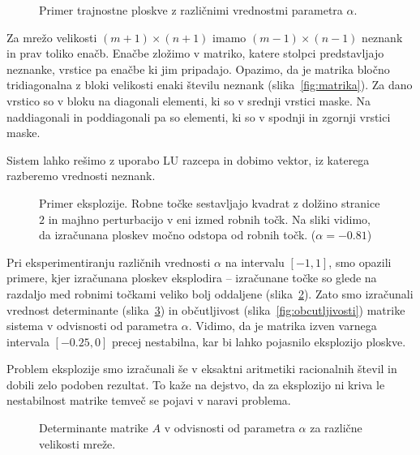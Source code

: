 \documentclass[twocolumn, 10pt]{article}    %
\begin{document}
\begin{figure}
    \centering
    \resizebox*{!}{7cm}{}
    \caption{Primer trajnostne ploskve z različnimi vrednostmi parametra $\alpha$.}
    \label{fig:alfe}
\end{figure}

Za mrežo velikosti $(m+1) \times (n+1)$ imamo $(m-1) \times (n-1)$ neznank in prav toliko enačb. Enačbe zložimo v matriko, katere stolpci predstavljajo neznanke, vrstice pa enačbe ki jim pripadajo. Opazimo, da je matrika bločno tridiagonalna z bloki velikosti enaki številu neznank (slika~\ref{fig:matrika}). Za dano vrstico so v bloku na diagonali elementi, ki so v srednji vrstici maske. Na naddiagonali in poddiagonali pa so elementi, ki so v spodnji in zgornji vrstici maske.

Sistem lahko rešimo z uporabo LU razcepa in dobimo vektor, iz katerega razberemo vrednosti neznank.

\begin{figure}
    \centering
    \resizebox*{!}{7cm}{}
    \caption{Primer eksplozije. Robne točke sestavljajo kvadrat z dolžino stranice $2$ in majhno perturbacijo v eni izmed robnih točk. Na sliki vidimo, da izračunana ploskev močno odstopa od robnih točk. ($\alpha = -0.81$)}
    \label{fig:eksplozija}
\end{figure}

Pri eksperimentiranju različnih vrednosti $\alpha$ na intervalu $[-1, 1]$, smo opazili primere, kjer izračunana ploskev eksplodira -- izračunane točke so glede na razdaljo med robnimi točkami veliko bolj oddaljene (slika~\ref{fig:eksplozija}). Zato smo izračunali vrednost determinante (slika~\ref{fig:determinante}) in občutljivost (slika~\ref{fig:obcutljivosti}) matrike sistema v odvisnosti od parametra $\alpha$. Vidimo, da je matrika izven varnega intervala $[-0.25, 0]$ precej nestabilna, kar bi lahko pojasnilo eksplozijo ploskve. 

Problem eksplozije smo izračunali še v eksaktni aritmetiki racionalnih števil in dobili zelo podoben rezultat. To kaže na dejstvo, da za eksplozijo ni kriva le nestabilnost matrike temveč se pojavi v naravi problema.


\begin{figure}
    \centering
    \resizebox*{!}{7cm}{}
    \caption{Determinante matrike $A$ v odvisnosti od parametra $\alpha$ za različne velikosti mreže.}
    \label{fig:determinante}
\end{figure}
\end{document}
